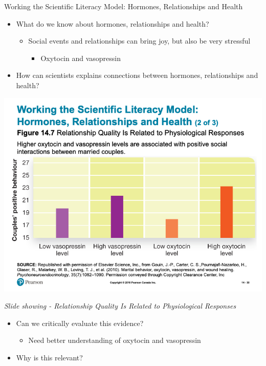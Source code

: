 \documentclass[
]{book}
\providecommand{\tightlist}{%
  \setlength{\itemsep}{0pt}\setlength{\parskip}{0pt}}
\begin{document}
\begin{reflect}
Working the Scientific Literacy Model: Hormones, Relationships and Health

\begin{itemize}
\tightlist
\item
  What do we know about hormones, relationships and health?

  \begin{itemize}
  \tightlist
  \item
    Social events and relationships can bring joy, but also be very stressful

    \begin{itemize}
    \tightlist
    \item
      Oxytocin and vasopressin\\
    \end{itemize}
  \end{itemize}
\item
  How can scientists explains connections between hormones, relationships and health?
\end{itemize}

\includegraphics{assets/unit_8/slide_30.png}

\emph{Slide showing - Relationship Quality Is Related to Physiological Responses}

\begin{itemize}
\tightlist
\item
  Can we critically evaluate this evidence?

  \begin{itemize}
  \tightlist
  \item
    Need better understanding of oxytocin and vasopressin\\
  \end{itemize}
\item
  Why is this relevant?


\end{itemize}
\end{reflect}
\end{document}
